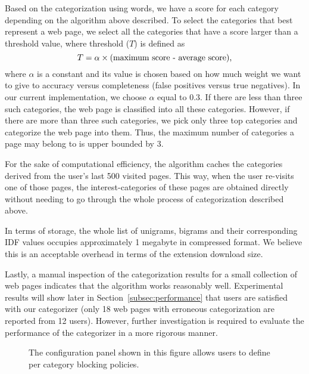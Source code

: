 \documentclass[conference]{IEEEtran}
\begin{document}
Based on the categorization using words, we have a score for each category depending on the algorithm above described.
To select the categories that best represent a web page, we select all the categories that have a score larger than a threshold value, where threshold ($T$) is defined as
$$
T = \alpha \times \textnormal{(maximum score - average score),}
$$
where  $\alpha$ is a constant and its value is chosen based on how much weight we want to give to accuracy versus completeness (false positives versus true negatives).
In our current implementation, we choose $\alpha$ equal to 0.3.
If there are less than three such categories, the web page is classified into all these categories.
However, if there are more than three such categories, we pick only three top categories and categorize the web page into them.
Thus, the maximum number of categories a page may belong to is upper bounded by 3.

For the sake of computational efficiency, the algorithm caches the categories derived from the user's last 500 visited pages. 
This way, when the user re-visits one of those pages, the interest-categories of these pages are obtained directly without needing to go through the whole process of categorization described above.

In terms of storage, the whole list of unigrams, bigrams and their corresponding IDF values occupies approximately 1 megabyte in compressed format. 
We believe this is an acceptable overhead in terms of the extension download size.

Lastly, a manual inspection of the categorization results for a small collection of web pages indicates that the algorithm works reasonably well. 
Experimental results will show later in Section~\ref{subsec:performance} that users are satisfied with our categorizer (only 18 web pages with erroneous categorization are reported from 12 users).
However, further investigation is required to evaluate the performance of the categorizer in a more rigorous manner.



\begin{figure}[t]
\centering
{}
\caption{The configuration panel shown in this figure allows users to define per category blocking policies.}
\label{fig:CatPolicyPanel}
\end{figure}
\end{document}
